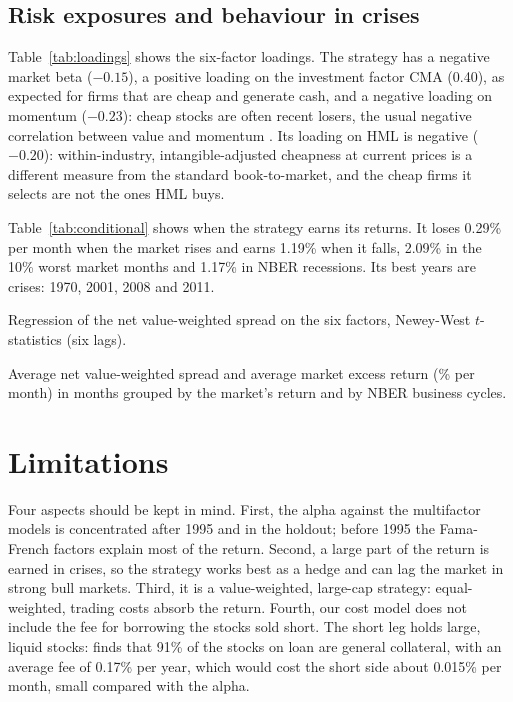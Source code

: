 \documentclass[12pt,a4paper]{article}
\newcommand{\tablenote}[1]{\par\vspace{4pt}\begin{minipage}{\linewidth}\footnotesize\singlespacing #1\end{minipage}}
\begin{document}
\subsection{Risk exposures and behaviour in crises}\label{sec:behaviour}

Table~\ref{tab:loadings} shows the six-factor loadings. The strategy has a negative market beta
($-0.15$), a positive loading on the investment factor CMA (0.40), as expected for firms that are
cheap and generate cash, and a negative loading on momentum ($-0.23$): cheap stocks are often recent
losers, the usual negative correlation between value and momentum
\citep{AsnessMoskowitzPedersen2013}. Its loading on HML is negative ($-0.20$): within-industry,
intangible-adjusted cheapness at current prices is a different measure from the standard
book-to-market, and the cheap firms it selects are not the ones HML buys.

Table~\ref{tab:conditional} shows when the strategy earns its returns. It loses 0.29\% per month when
the market rises and earns 1.19\% when it falls, 2.09\% in the 10\% worst market months and 1.17\% in
NBER recessions. Its best years are crises: 1970, 2001, 2008 and 2011.

\begin{table}[H]
\centering
\caption{Six-factor loadings of the net spread, 1963--2015}\label{tab:loadings}

\tablenote{Regression of the net value-weighted spread on the six factors, Newey-West $t$-statistics
(six lags).}
\end{table}

\begin{table}[H]
\centering
\caption{Returns in good and bad markets, 1963--2015}\label{tab:conditional}

\tablenote{Average net value-weighted spread and average market excess return (\% per month) in
months grouped by the market's return and by NBER business cycles.}
\end{table}

\section{Limitations}\label{sec:limits}

Four aspects should be kept in mind. First, the alpha against the multifactor models is concentrated
after 1995 and in the holdout; before 1995 the Fama-French factors explain most of the return.
Second, a large part of the return is earned in crises, so the strategy works best as a hedge and
can lag the market in strong bull markets. Third, it is a value-weighted, large-cap strategy:
equal-weighted, trading costs absorb the return. Fourth, our cost model does not include the fee for
borrowing the stocks sold short. The short leg holds large, liquid stocks: \citet{DAvolio2002} finds
that 91\% of the stocks on loan are general collateral, with an average fee of 0.17\% per year, which
would cost the short side about 0.015\% per month, small compared with the alpha.
\end{document}
